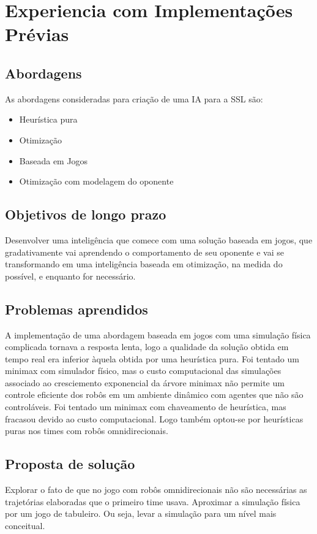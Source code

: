 \chapter{Experiencia com Implementações Prévias}

\section{Abordagens}

As abordagens consideradas para criação de uma IA para a SSL são:
\begin{itemize}
 \item Heurística pura
 \item Otimização
 \item Baseada em Jogos
 \item Otimização com modelagem do oponente
\end{itemize}

\section{Objetivos de longo prazo}
Desenvolver uma inteligência que comece com uma solução baseada em jogos, que
gradativamente vai aprendendo o comportamento de seu oponente e vai se
transformando em uma inteligência baseada em otimização, na medida do possível, e
enquanto for necessário.

\section{Problemas aprendidos}
A implementação de uma abordagem baseada em jogos com uma simulação física complicada
tornava a resposta lenta, logo a qualidade da solução obtida em tempo real era inferior
àquela obtida por uma heurística pura.
Foi tentado um minimax com simulador físico, mas o custo computacional das simulações
associado ao cresciemento exponencial da árvore minimax não permite um controle eficiente
dos robôs em um ambiente dinâmico com agentes que não são controláveis.
Foi tentado um minimax com chaveamento de heurística, mas fracasou devido ao
custo computacional. Logo também optou-se por heurísticas puras nos
times com robôs omnidirecionais.

\section{Proposta de solução}
Explorar o fato de que no jogo com robôs omnidirecionais não são necessárias as
trajetórias elaboradas que o primeiro time usava.
Aproximar a simulação física por um jogo de tabuleiro. Ou seja, levar a simulação para um
nível mais conceitual.

